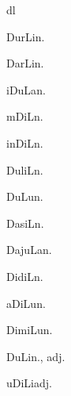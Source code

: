 \begin{multicols*}{2}
\begin{dictroot}{d}{l}
\begin{dictentry}{DurLi}{n.}
{        }
    \end{dictentry}
    \begin{dictentry}{DarLi}{n.}
    \end{dictentry}
    \begin{dictentry}{iDuLa}{n.}
    \end{dictentry}
    \begin{dictentry}{mDiL}{n.}
    \end{dictentry}
    \begin{dictentry}{inDiL}{n.}
    \end{dictentry}
    \begin{dictentry}{DuliL}{n.}
    \end{dictentry}
    \begin{dictentry}{DuLu}{n.}
        \dictdef*{

        }
    \end{dictentry}
    \begin{dictentry}{DasiL}{n.}
        \dictdef*{

        }
    \end{dictentry}
    \begin{dictentry}{DajuLa}{n.}
    \end{dictentry}
    \begin{dictentry}{DidiL}{n.}
        \dictdef*{

        }
    \end{dictentry}
    \begin{dictentry}{aDiLu}{n.}
    \end{dictentry}
    \begin{dictentry}{DimiLu}{n.}
        \dictdef*{

        }
    \end{dictentry}
    \begin{dictentry}{DuLi}{n., adj.}
        \dictdef*{

        }
    \end{dictentry}
    \begin{dictentry}{uDiLi}{adj.}
        \dictdef*{

}
\end{dictentry}
\end{dictroot}
\end{multicols*}
